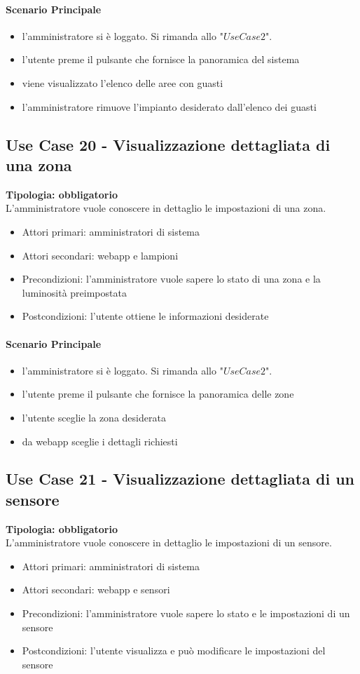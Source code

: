 \documentclass[12pt]{article}
\begin{document}
\paragraph{Scenario Principale}
\begin{itemize}
	\item l'amministratore si è loggato. Si rimanda allo "$Use Case 2$".
	\item l'utente preme il pulsante che fornisce la panoramica del sistema
	\item viene visualizzato l'elenco delle aree con guasti
	\item l'amministratore rimuove l'impianto desiderato dall'elenco dei guasti
\end{itemize}

\subsection{Use Case 20 - Visualizzazione dettagliata di una zona}
\textbf{Tipologia: obbligatorio} \\
L'amministratore vuole conoscere in dettaglio le impostazioni di una zona.
\begin{itemize}
	\item Attori primari: amministratori di sistema
	\item Attori secondari: webapp e lampioni
	\item Precondizioni: l'amministratore vuole sapere lo stato di una zona e la luminosità preimpostata
	\item Postcondizioni: l'utente ottiene le informazioni desiderate
\end{itemize}
\paragraph{Scenario Principale}
\begin{itemize}
	\item l'amministratore si è loggato. Si rimanda allo "$Use Case 2$".
	\item l'utente preme il pulsante che fornisce la panoramica delle zone
	\item l'utente sceglie la zona desiderata
	\item da webapp sceglie i dettagli richiesti
\end{itemize}

\subsection{Use Case 21 - Visualizzazione dettagliata di un sensore}
\textbf{Tipologia: obbligatorio} \\
L'amministratore vuole conoscere in dettaglio le impostazioni di un sensore.
\begin{itemize}
	\item Attori primari: amministratori di sistema
	\item Attori secondari: webapp e sensori
	\item Precondizioni: l'amministratore vuole sapere lo stato e le impostazioni di un sensore
	\item Postcondizioni: l'utente visualizza e può modificare le impostazioni del sensore
\end{itemize}
\end{document}
